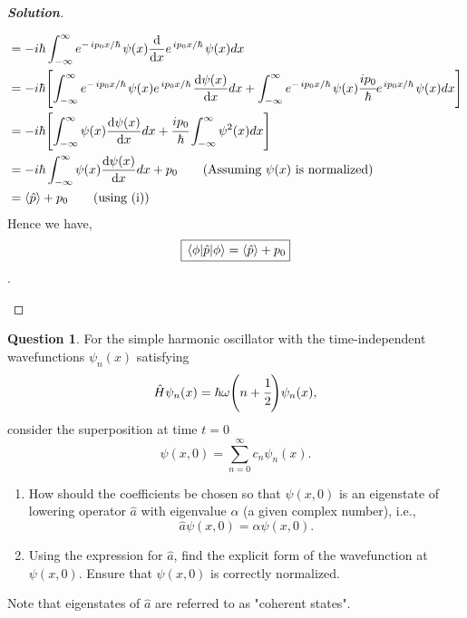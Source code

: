 \documentclass[10pt]{scrartcl}
\theoremstyle{definition}
\newtheorem{exercise}{Question}
\newenvironment{solution} {\begin{proof}[\normalfont \textbf{Solution}]} {\end{proof}}
\newcommand*{\Op}{\hat{p}}
\newcommand*{\OH}{\hat{H}}
\begin{document}
\begin{solution}
\begin{enumerate}[label=(\alph*)]
\begin{align*}
                                &= -i\hbar\int_{-\infty}^{\infty}  e^{-\flatfrac{ip_0x}{\hbar}}\psi(x) \dv{x}e^{\flatfrac{ip_0x}{\hbar}}\psi(x) dx \\ 
                                &= -i\hbar\qty[\int_{-\infty}^{\infty}  e^{-\flatfrac{ip_0x}{\hbar}}\psi(x) e^{\flatfrac{ip_0x}{\hbar}}\dv{\psi(x)}{x} dx + \int_{-\infty}^{\infty}  e^{-\flatfrac{ip_0x}{\hbar}}\psi(x) \cfrac{ip_0}{\hbar}e^{\flatfrac{ip_0x}{\hbar}}\psi(x) dx] \\ 
                                &= -i\hbar\qty[\int_{-\infty}^{\infty}  \psi(x) \dv{\psi(x)}{x} dx + \cfrac{ip_0}{\hbar}\int_{-\infty}^{\infty} \psi^2(x) dx] \\ 
                                &= -i\hbar\int_{-\infty}^{\infty}  \psi(x) \dv{\psi(x)}{x} dx + p_0 \tag{Assuming $\psi(x)$ is normalized}\\ 
                                &= \expval{\Op} + p_0 \tag{using (i)}
            \end{align*}
            Hence we have, $$\boxed{\ev{\Op}{\phi} = \expval{\Op} + p_0}$$.

    \end{enumerate}
\end{solution}
\begin{exercise}
    For the simple harmonic oscillator with the time-independent wavefunctions $\psi_n(x)$ satisfying
    \begin{equation*}
        \OH \psi_n(x) = \hbar \omega \qty(n + \cfrac{1}{2}) \psi_n(x),
    \end{equation*}
    consider the superposition at time $t = 0$
    \begin{equation*}
        \psi(x, 0) = \sum_{n=0}^\infty c_n \psi_n(x).
    \end{equation*}
    \begin{enumerate}[label=(\alph*)]
        \item How should the coefficients be chosen so that $\psi(x, 0)$ is an eigenstate of lowering operator $\hat{a}$ with eigenvalue $\alpha$ (a given complex number), i.e.,
              \begin{equation*}
                  \hat{a} \psi(x, 0) = \alpha \psi(x, 0).
              \end{equation*}

        \item Using the expression for $\hat{a}$, find the explicit form of the wavefunction at $\psi(x, 0)$. Ensure that $\psi(x, 0)$ is correctly normalized.
    \end{enumerate}
    Note that eigenstates of $\hat{a}$ are referred to as "coherent states".
\end{exercise}
\end{document}
